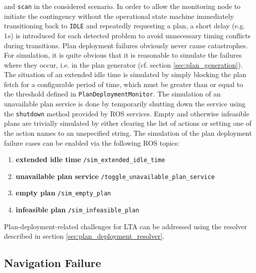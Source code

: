 \documentclass[english, master, utf8]{base/thesis_KBS}
\newcommand{\code}[1]{\colorbox{light-gray}{\texttt{#1}}}
\begin{document}
and \code{scan} in the considered scenario. In order to allow the monitoring node to initiate the contingency without the operational state machine immediately transitioning back
to \code{IDLE} and repeatedly requesting a plan, a short delay (e.g. $1s$) is introduced for each detected problem to avoid unnecessary timing conflicts during transitions.
Plan deployment failures obviously never cause catastrophes.
For simulation, it is quite obvious that it is reasonable to simulate the failures where they occur, i.e. in the plan generator (cf. section \ref{sec:plan_generation}). The
situation of an extended idle time is simulated by simply blocking the plan fetch for a configurable period of time, which must be greater than or equal to the threshold defined
in \code{PlanDeploymentMonitor}. The simulation of an unavailable plan service is done by temporarily shutting down the service using the \code{shutdown} method provided by ROS services.
Empty and otherwise infeasible plans are trivially simulated by either clearing the list of actions or setting one of the action names to an unspecified string.
The simulation of the plan deployment failure cases can be enabled via the following ROS topics:
\begin{enumerate}
    \item \textbf{extended idle time} \textrightarrow \code{/sim\_extended\_idle\_time}
    \item \textbf{unavailable plan service} \textrightarrow \code{/toggle\_unavailable\_plan\_service}
    \item \textbf{empty plan} \textrightarrow \code{/sim\_empty\_plan}
    \item \textbf{infeasible plan} \textrightarrow \code{/sim\_infeasible\_plan}
\end{enumerate}
\noindent
Plan-deployment-related challenges for LTA can be addressed using the resolver described in section \ref{sec:plan_deployment_resolver}.

\subsection{Navigation Failure}
\label{sec:sim_and_mon_navigation_failures}
\end{document}

